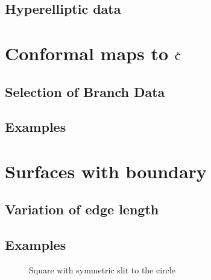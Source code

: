 \subsection{Hyperelliptic data}

\section{Conformal maps to $\hat{\mathbb C}$}
\subsection{Selection of Branch Data}
\subsection{Examples}

\section{Surfaces with boundary}
\label{sec:surfaces_with_boundary}
\subsection{Variation of edge length}
\subsection{Examples}
\begin{figure}
\centering
{}
\caption{Square with symmetric slit to the circle}
\label{fig:slit_circle}
\end{figure}


